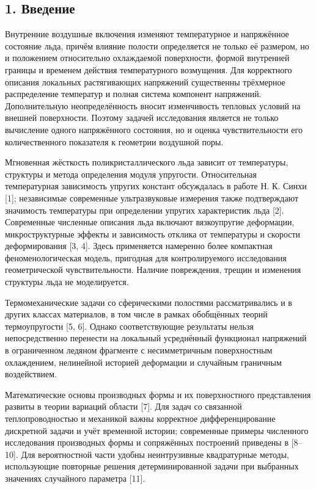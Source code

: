 \documentclass[
]{article}
\begin{document}
\subsection{1. Введение}\label{ux432ux432ux435ux434ux435ux43dux438ux435}

Внутренние воздушные включения изменяют температурное и напряжённое
состояние льда, причём влияние полости определяется не только её
размером, но и положением относительно охлаждаемой поверхности, формой
внутренней границы и временем действия температурного возмущения. Для
корректного описания локальных растягивающих напряжений существенны
трёхмерное распределение температур и полная система компонент
напряжений. Дополнительную неопределённость вносит изменчивость тепловых
условий на внешней поверхности. Поэтому задачей исследования является не
только вычисление одного напряжённого состояния, но и оценка
чувствительности его количественного показателя к геометрии воздушной
поры.

Мгновенная жёсткость поликристаллического льда зависит от температуры,
структуры и метода определения модуля упругости. Относительная
температурная зависимость упругих констант обсуждалась в работе Н. К.
Синхи {[}1{]}; независимые современные ультразвуковые измерения также
подтверждают значимость температуры при определении упругих
характеристик льда {[}2{]}. Современные численные описания льда включают
вязкоупругие деформации, микроструктурные эффекты и зависимость отклика
от температуры и скорости деформирования {[}3, 4{]}. Здесь применяется
намеренно более компактная феноменологическая модель, пригодная для
контролируемого исследования геометрической чувствительности. Наличие
повреждения, трещин и изменения структуры льда не моделируется.

Термомеханические задачи со сферическими полостями рассматривались и в
других классах материалов, в том числе в рамках обобщённых теорий
термоупругости {[}5, 6{]}. Однако соответствующие результаты нельзя
непосредственно перенести на локальный усреднённый функционал напряжений
в ограниченном ледяном фрагменте с несимметричным поверхностным
охлаждением, нелинейной историей деформации и случайным граничным
воздействием.

Математические основы производных формы и их поверхностного
представления развиты в теории вариаций области {[}7{]}. Для задач со
связанной теплопроводностью и механикой важны корректное
дифференцирование дискретной задачи и учёт временной истории;
современные примеры численного исследования производных формы и
сопряжённых построений приведены в {[}8--10{]}. Для вероятностной части
удобны неинтрузивные квадратурные методы, использующие повторные решения
детерминированной задачи при выбранных значениях случайного параметра
{[}11{]}.
\end{document}
